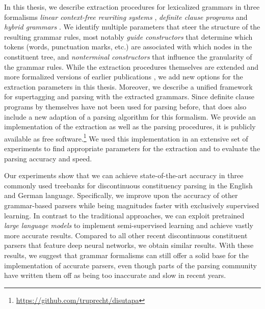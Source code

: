 \documentclass{scrartcl}
\begin{document}
    In this thesis, we describe extraction procedures for lexicalized grammars in three formalisms \emph{linear context-free rewriting systems} \citep{VijWeiJos87}, \emph{definite clause programs} \citep{Der85} and \emph{hybrid grammars} \citep{Ned14}.
    We identify multiple parameters that steer the structure of the resulting grammar rules, most notably \emph{guide constructors} that determine which tokens (words, punctuation marks, etc.) are associated with which nodes in the constituent tree, and \emph{nonterminal constructors} that influence the granularity of the grammar rules.
    While the extraction procedures themselves are extended and more formalized versions of earlier publications \citep{RupMoe21,Rup22}, we add new options for the extraction parameters in this thesis.
    Moreover, we describe a unified framework for supertagging and parsing with the extracted grammars.
    Since definite clause programs by themselves have not been used for parsing before, that does also include a new adaption of a parsing algorithm for this formalism.
    We provide an implementation of the extraction as well as the parsing procedures, it is publicly available as free software.\footnote{\url{https://github.com/truprecht/disutapa}}
    We used this implementation in an extensive set of experiments to find appropriate parameters for the extraction and to evaluate the parsing accuracy and speed.

    Our experiments show that we can achieve state-of-the-art accuracy in three commonly used treebanks for discontinuous constituency parsing in the English and German language.
    Specifically, we improve upon the accuracy of other grammar-based parsers while being magnitudes faster with exclusively supervised learning.
    In contrast to the traditional approaches, we can exploit pretrained \emph{large language models} to implement semi-supervised learning and achieve vastly more accurate results.
    Compared to all other recent discontinuous constituent parsers that feature deep neural networks, we obtain similar results.
    With these results, we suggest that grammar formalisms can still offer a solid base for the implementation of accurate parsers, even though parts of the parsing community have written them off as being too inaccurate and slow in recent years.
    
    
\end{document}
